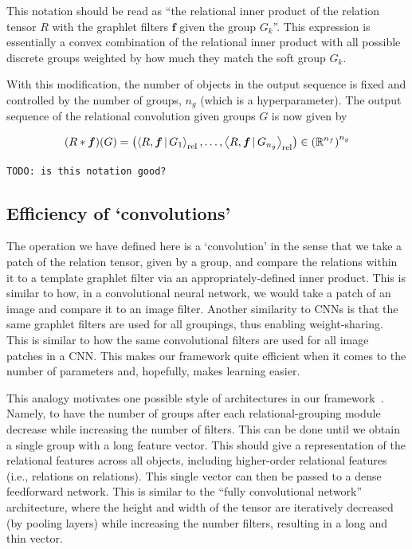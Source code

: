 This notation should be read as ``the relational inner product of the relation tensor $R$ with the graphlet filters $\boldsymbol{f}$ given the group $G_k$''. This expression is essentially a convex combination of the relational inner product with all possible discrete groups weighted by how much they match the soft group $G_k$.

With this modification, the number of objects in the output sequence is fixed and controlled by the number of groups, $n_g$ (which is a hyperparameter). The output sequence of the relational convolution given groups $G$ is now given by

\begin{equation}
    \label{eq:soft_relational_convolution_groups}
    (R \ast \bm{f})(G) = \left( \left\langle R, \bm{f} \, \vert \, G_1 \right\rangle_\mathrm{rel}, \ldots, \left\langle R, \bm{f} \, \vert \, G_{n_g} \right\rangle_\mathrm{rel} \right) \in \left(\mathbb{R}^{n_f}\right)^{n_g}
\end{equation}

\texttt{TODO: is this notation good?}

\subsection{Efficiency of `convolutions'}
The operation we have defined here is a `convolution' in the sense that we take a patch of the relation tensor, given by a group, and compare the relations within it to a template graphlet filter via an appropriately-defined inner product. This is similar to how, in a convolutional neural network, we would take a patch of an image and compare it to an image filter. Another similarity to CNNs is that the same graphlet filters are used for all groupings, thus enabling weight-sharing. This is similar to how the same convolutional filters are used for all image patches in a CNN. This makes our framework quite efficient when it comes to the number of parameters and, hopefully, makes learning easier.


This analogy motivates one possible style of architectures in our framework~. Namely, to have the number of groups after each relational-grouping module decrease while increasing the number of filters. This can be done until we obtain a single group with a long feature vector. This should give a representation of the relational features across all objects, including higher-order relational features (i.e., relations on relations). This single vector can then be passed to a dense feedforward network. This is similar to the ``fully convolutional network'' architecture, where the height and width of the tensor are iteratively decreased (by pooling layers) while increasing the number filters, resulting in a long and thin vector.

